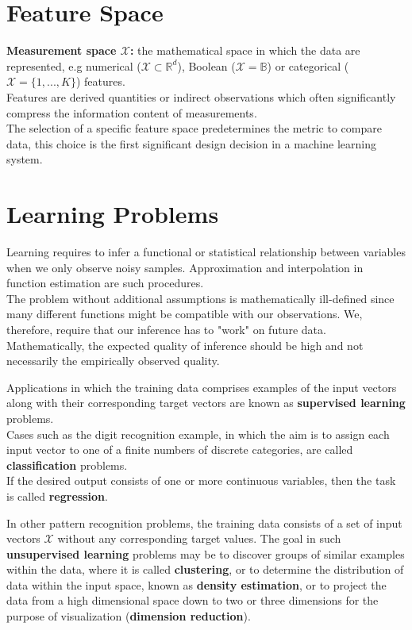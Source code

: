 \documentclass[twoside]{article}
\begin{document}
\section{Feature Space}

\textbf{Measurement space $\mathcal{X}$:} the mathematical space in which the data are represented, e.g numerical ($\mathcal{X} \subset \mathbb{R}^d$), Boolean ($\mathcal{X} = \mathbb{B}$) or categorical ($\mathcal{X} = \{1, ..., K\}$) features.\\
Features are derived quantities or indirect observations which often significantly compress the information content of measurements.\\
The selection of a specific feature space predetermines the metric to compare data, this choice is the first significant design decision in a machine learning system.

\newpage

\section{Learning Problems}

Learning requires to infer a functional or statistical relationship between variables when we only observe noisy samples.
Approximation and interpolation in function estimation are such procedures. \\
The problem without additional assumptions is mathematically ill-defined since many different functions might be compatible with our observations. We, therefore, require that our inference has to "work" on future data.
Mathematically, the expected quality of inference should be high and not necessarily the empirically observed quality.\medskip

Applications in which the training data comprises examples of the input vectors along with their corresponding target vectors are known as \textbf{supervised learning} problems.\\
Cases such as the digit recognition example, in which the aim is to assign each input vector to one of a finite numbers of discrete categories, are called \textbf{classification} problems.\\
If the desired output consists of one or more continuous variables, then the task is called \textbf{regression}.\medskip

In other pattern recognition problems, the training data consists of a set of input vectors $\mathcal{X}$ without any corresponding target values. The goal in such \textbf{unsupervised learning} problems may be to discover groups of similar examples within the data, where it is called \textbf{clustering}, or to determine the distribution of data within the input space, known as \textbf{density estimation}, or to project the data from a high dimensional space down to two or three dimensions for the purpose of visualization (\textbf{dimension reduction}).\medskip
\end{document}
